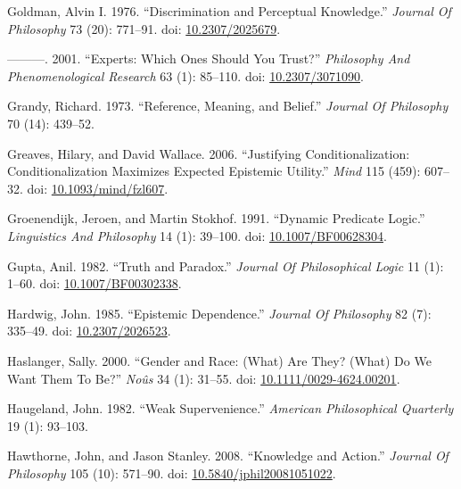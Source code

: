 \documentclass[
  10pt,
  letterpaper,
  DIV=11,
  numbers=noendperiod,
  twoside]{scrartcl}
\newlength{\cslhangindent}
\newenvironment{CSLReferences}[2] %
 {\begin{list}{}{%
  \setlength{\itemindent}{0pt}
  \setlength{\leftmargin}{0pt}
  \setlength{\parsep}{0pt}
  \ifodd #1
   \setlength{\leftmargin}{\cslhangindent}
   \setlength{\itemindent}{-1\cslhangindent}
  \fi
  \setlength{\itemsep}{#2\baselineskip}}}
 {\end{list}}
\begin{document}
\begin{CSLReferences}{1}{0}
Goldman, Alvin I. 1976. {``Discrimination and Perceptual Knowledge.''}
\emph{Journal Of Philosophy} 73 (20): 771--91. doi:
\href{https://doi.org/10.2307/2025679}{10.2307/2025679}.

---------. 2001. {``Experts: Which Ones Should You Trust?''}
\emph{Philosophy And Phenomenological Research} 63 (1): 85--110. doi:
\href{https://doi.org/10.2307/3071090}{10.2307/3071090}.

Grandy, Richard. 1973. {``Reference, Meaning, and Belief.''}
\emph{Journal Of Philosophy} 70 (14): 439--52.

Greaves, Hilary, and David Wallace. 2006. {``Justifying
Conditionalization: Conditionalization Maximizes Expected Epistemic
Utility.''} \emph{Mind} 115 (459): 607--32. doi:
\href{https://doi.org/10.1093/mind/fzl607}{10.1093/mind/fzl607}.

Groenendijk, Jeroen, and Martin Stokhof. 1991. {``Dynamic Predicate
Logic.''} \emph{Linguistics And Philosophy} 14 (1): 39--100. doi:
\href{https://doi.org/10.1007/BF00628304}{10.1007/BF00628304}.

Gupta, Anil. 1982. {``Truth and Paradox.''} \emph{Journal Of
Philosophical Logic} 11 (1): 1--60. doi:
\href{https://doi.org/10.1007/BF00302338}{10.1007/BF00302338}.

Hardwig, John. 1985. {``Epistemic Dependence.''} \emph{Journal Of
Philosophy} 82 (7): 335--49. doi:
\href{https://doi.org/10.2307/2026523}{10.2307/2026523}.

Haslanger, Sally. 2000. {``Gender and Race: (What) Are They? (What) Do
We Want Them To Be?''} \emph{Noûs} 34 (1): 31--55. doi:
\href{https://doi.org/10.1111/0029-4624.00201}{10.1111/0029-4624.00201}.

Haugeland, John. 1982. {``Weak Supervenience.''} \emph{American
Philosophical Quarterly} 19 (1): 93--103.

Hawthorne, John, and Jason Stanley. 2008. {``Knowledge and Action.''}
\emph{Journal Of Philosophy} 105 (10): 571--90. doi:
\href{https://doi.org/10.5840/jphil20081051022}{10.5840/jphil20081051022}.


\end{CSLReferences}
\end{document}
